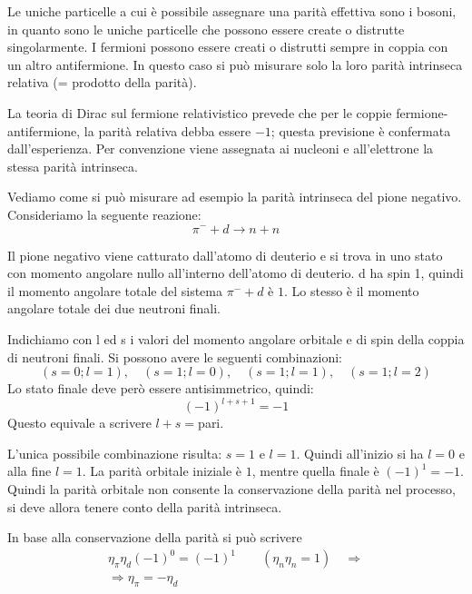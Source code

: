 Le uniche particelle a cui è possibile assegnare una parità effettiva sono i bosoni, in quanto sono le uniche particelle che
possono essere create o distrutte singolarmente. I fermioni possono essere creati o distrutti sempre in coppia con un altro
antifermione. In questo caso si può misurare solo la loro parità intrinseca relativa (= prodotto della parità).

La teoria di Dirac sul fermione relativistico prevede che per le coppie fermione-antifermione, la parità relativa debba essere
$-1$; questa previsione è confermata dall'esperienza. Per convenzione viene assegnata ai nucleoni e all'elettrone la stessa
parità intrinseca.

Vediamo come si può misurare ad esempio la parità intrinseca del pione negativo. Consideriamo la seguente reazione:
\begin{equation*}
 \pi^- + d \rightarrow n + n
\end{equation*}

Il pione negativo viene catturato dall'atomo di deuterio e si trova in uno stato con momento angolare nullo all'interno
dell'atomo di deuterio. d ha spin 1, quindi il momento angolare totale del sistema $\pi^- + d$ è $1$. Lo stesso è il momento
angolare totale dei due neutroni finali.

Indichiamo con l ed s i valori del momento angolare orbitale e di spin della coppia di neutroni finali. Si possono avere le
seguenti combinazioni:
\begin{equation*}
 (s=0; l=1),\quad (s=1; l=0), \quad (s=1; l=1), \quad (s=1; l=2)
\end{equation*}
Lo stato finale deve però essere antisimmetrico, quindi:
\begin{equation*}
 (-1)^{l+s+1} = -1
\end{equation*}
Questo equivale a scrivere $l+s=$pari.

L'unica possibile combinazione risulta: $s = 1$ e $l = 1$. Quindi all'inizio si ha $l = 0$ e alla fine $l = 1$. La parità orbitale iniziale è $1$, mentre quella finale è $(-1)^1 = -1$.
Quindi la parità orbitale non consente la conservazione della parità nel processo, si deve allora tenere conto della parità
intrinseca.

In base alla conservazione della parità si può scrivere
\begin{gather*}
 \eta_{\pi} \eta_d (-1)^0 = (-1)^1 \quad\quad (\eta_n \eta_n = 1)\quad\Rightarrow \\
\Rightarrow \eta_{\pi} = -\eta_d
\end{gather*}

